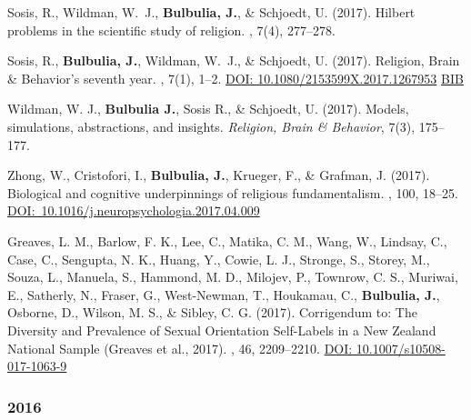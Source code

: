 \documentclass{article}
\begin{document}
\begin{thebibliography}{99}
Sosis, R., Wildman, W.~J., {\bf Bulbulia, J.}, \& Schjoedt, U. (2017).
\newblock Hilbert problems in the scientific study of religion.
, 7(4), 277--278.


Sosis, R., {\bf Bulbulia, J.}, Wildman, W.~J., \& Schjoedt, U. (2017).
\newblock Religion, Brain \& Behavior's seventh year.
, 7(1), 1--2.
\href{https://doi.org/10.1080/2153599X.2017.1267953}{DOI: 10.1080/2153599X.2017.1267953}
\href{https://www.dropbox.com/s/ywxsyerusw7s59w/tandf_rrbb207_1.bib?dl=0}{BIB}


Wildman, W. J., {\bf Bulbulia J.}, Sosis R., \& Schjoedt, U. (2017). 
\newblock  Models, simulations, abstractions, and insights.
{\em Religion, Brain \& Behavior},  7(3),  175--177.


Zhong, W., Cristofori, I., {\bf Bulbulia, J.}, Krueger, F., \& Grafman, J. (2017). 
\newblock Biological and cognitive underpinnings of religious fundamentalism. 
, 100, 18--25.
\href{https://doi.org/10.1016/j.neuropsychologia.2017.04.009}{DOI:~10.1016/j.neuropsychologia.2017.04.009}


Greaves, L. M., Barlow, F. K., Lee, C., Matika, C. M., Wang, W., Lindsay, C., Case, C., Sengupta, N. K., Huang, Y., Cowie, L. J., Stronge, S., Storey, M., Souza,  L., Manuela, S., Hammond, M. D., Milojev, P., Townrow, C. S., Muriwai, E., Satherly, N., Fraser, G., West-Newman, T., Houkamau, C., {\bf Bulbulia, J.}, Osborne, D., Wilson, M. S., \& Sibley, C. G.  (2017). 
\newblock Corrigendum to: The Diversity and Prevalence of Sexual Orientation Self-Labels in a New Zealand National Sample (Greaves et al., 2017). 
, 46, 2209–2210.
\href{ https://doi.org/10.1007/s10508-017-1063-9}{DOI: 10.1007/s10508-017-1063-9}


\subsubsection*{2016} 




\end{thebibliography}
\end{document}
